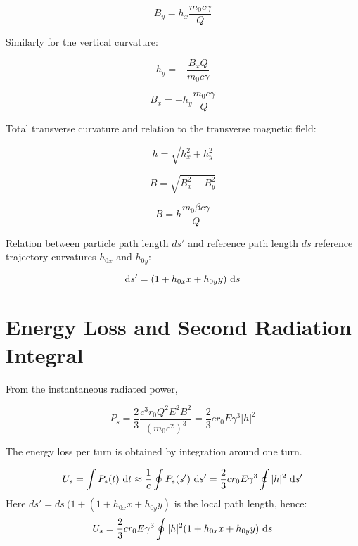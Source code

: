 \begin{equation}
    B_y = h_x \frac{m_0 c \gamma}{Q}
    \label{eq:bytocurvx}
\end{equation}

Similarly for the vertical curvature:

\begin{equation}
    h_y = -\frac{B_x Q}{m_0 c \gamma}
    \label{eq:curvy}
\end{equation}

\begin{equation}
    B_x = -h_y \frac{m_0 c \gamma}{Q}
    \label{eq:bxtocurvy}
\end{equation}

Total transverse curvature and relation to the transverse magnetic field:

\begin{equation}
    h = \sqrt{h_x^2 + h_y^2}
\end{equation}

\begin{equation}
    B = \sqrt{B_x^2 + B_y^2}
\end{equation}

\begin{equation}
    B = h  \frac{m_0 \beta c \gamma}{Q}
    \label{eq:btocurv}
\end{equation}

Relation between particle path length $ds'$ and reference path length $ds$
reference trajectory curvatures $h_{0x}$ and $h_{0y}$:

\begin{equation}
    \text{d} s' = (1 + h_{0x}x + h_{0y}y)\ \text{d} s
    \label{eq:pathlength}
\end{equation}


\section{Energy Loss and Second Radiation Integral}
\label{sec:enelossandi2}

From the instantaneous radiated power,

\begin{equation}
    P_s = \frac{2}{3}\frac{c^3 r_0 Q^2 E^2 B^2}{(m_0 c^2)^3} = \frac{2}{3} c r_0 E \gamma^3 |h|^2
    \label{eq:instpower}
\end{equation}

The energy loss per turn is obtained by integration around one turn.

\begin{equation}
U_s = \int P_s(t) \ \text{d} t \approx \frac{1}{c} \oint P_s(s') \ \text{d} s'
= \frac{2}{3} c r_0 E \gamma^3 \oint |h|^2 \ \text{d} s'
\end{equation}
Here $ds'= ds \ (1 + (1 + h_{0x}x + h_{0y}y)$ is the local path length, hence:
\begin{equation}
U_s =  \frac{2}{3} c r_0 E \gamma^3 \oint |h|^2 (1 + h_{0x}x + h_{0y}y) \ \dee s 
\end{equation}

